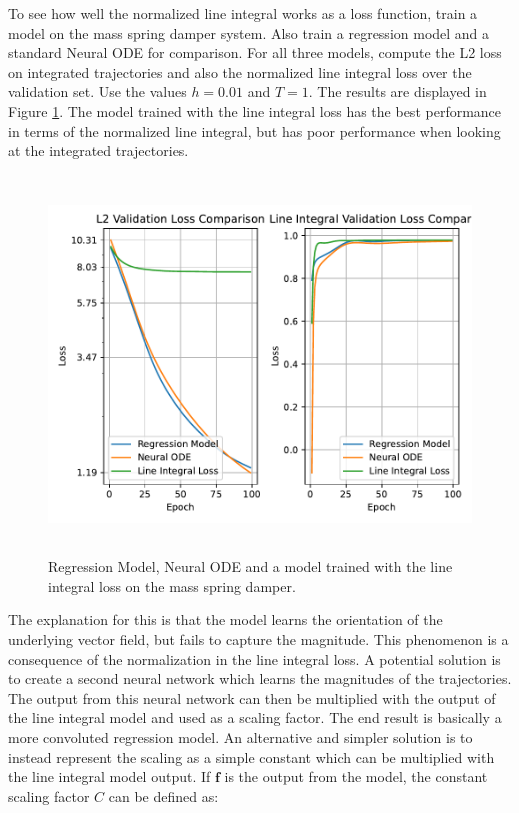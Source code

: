 \documentclass[12pt,a4paper]{book}
\begin{document}
To see how well the normalized line integral works as a loss function, train a model on the mass spring damper system. Also train a regression model and a standard Neural ODE for comparison. For all three models, compute the L2 loss on integrated trajectories and also the normalized line integral loss over the validation set. Use the values $h=0.01$ and $T=1$. The results are displayed in Figure \ref{fig:line_integral_comparison_no_k}. The model trained with the line integral loss has the best performance in terms of the normalized line integral, but has poor performance when looking at the integrated trajectories.

\begin{figure}[H]
    \centering
    \includegraphics[height=10cm]{figs/plots/motion_classification/line_integral_comparison_no_k.pdf}
    \caption{Regression Model, Neural ODE and a model trained with the line integral loss on the mass spring damper.}
    \label{fig:line_integral_comparison_no_k}
\end{figure}

The explanation for this is that the model learns the orientation of the underlying vector field, but fails to capture the magnitude. This phenomenon is a consequence of the normalization in the line integral loss. A potential solution is to create a second neural network which learns the magnitudes of the trajectories. The output from this neural network can then be multiplied with the output of the line integral model and used as a scaling factor. The end result is basically a more convoluted regression model. An alternative and simpler solution is to instead represent the scaling as a simple constant which can be multiplied with the line integral model output. If $\bm{f}$ is the output from the model, the constant scaling factor $C$ can be defined as:
\end{document}
